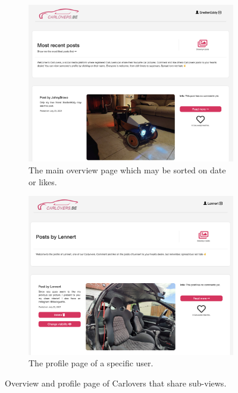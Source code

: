 \begin{figure}[H]
     \centering
     \begin{subfigure}[b]{0.9\textwidth}
         \centering
         \includegraphics[width=\textwidth]{images/homesnellen.png}
         \caption{The main overview page which may be sorted on date or likes.}
         \label{fig:overview}
     \end{subfigure}
     \hfill
     \begin{subfigure}[b]{0.9\textwidth}
         \centering
         \includegraphics[width=\textwidth]{images/profile.png}
         \caption{The profile page of a specific user.}
         \label{fig:profile}
     \end{subfigure}
        \caption{Overview and profile page of Carlovers that share sub-views.}
        \label{fig:overview_profile}
\end{figure}


